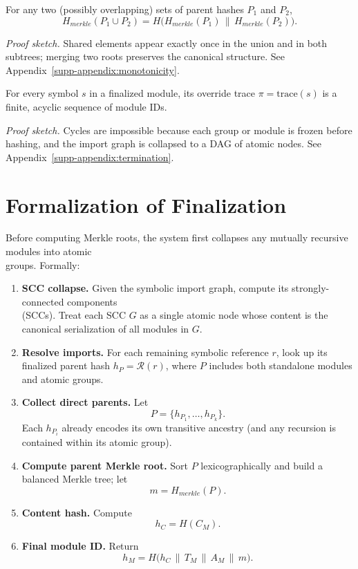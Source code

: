 \documentclass[sigplan,screen]{acmart}
\begin{document}
\begin{theorem}
\label{thm:merkleHash_compositional}
For any two (possibly overlapping) sets of parent hashes \(P_1\) and \(P_2\),
\[
	H_{\mathit{merkle}}(P_1 \cup P_2)
		= H\bigl(H_{\mathit{merkle}}(P_1)\,\|\,
			H_{\mathit{merkle}}(P_2)\bigr).
\]
\end{theorem}
\noindent\emph{Proof sketch.}  Shared elements appear exactly once in the union and in both subtrees; merging two roots preserves the canonical structure.  See Appendix~\ref{supp-appendix:monotonicity}.

\begin{proposition}
\label{prop:overrideTrace_properties}
For every symbol \(s\) in a finalized module, its override trace \(\pi = \mathrm{trace}(s)\) is a finite, acyclic sequence of module IDs.
\end{proposition}
\noindent\emph{Proof sketch.}  Cycles are impossible because each group or module is frozen before hashing, and the import graph is collapsed to a DAG of atomic nodes.  See Appendix~\ref{supp-appendix:termination}.

\section{Formalization of Finalization}
\label{sec:formalization-finalization}

Before computing Merkle roots, the system first collapses any mutually recursive modules into atomic \\groups. Formally:

\begin{enumerate}
	\item \textbf{SCC collapse.} Given the symbolic import graph, compute its strongly-connected components \\(SCCs). Treat each SCC \(G\) as a single atomic node whose content is the canonical serialization of all modules in \(G\).
	\item \textbf{Resolve imports.} For each remaining symbolic reference \(r\), look up its finalized parent hash \(h_{P} = \mathcal{R}(r)\), where \(P\) includes both standalone modules and atomic groups.
	\item \textbf{Collect direct parents.} Let
	\[
		P = \{h_{P_1}, \dots, h_{P_k}\}.
	\]
	Each \(h_{P_i}\) already encodes its own transitive ancestry (and any recursion is contained within its atomic group).
	\item \textbf{Compute parent Merkle root.} Sort \(P\) lexicographically and build a balanced Merkle tree; let
	\[
		m = H_{\mathit{merkle}}(P).
	\]
	\item \textbf{Content hash.} Compute
	\[
		h_C = H(C_M).
	\]
	\item \textbf{Final module ID.} Return
	\[
		h_M = H\bigl(h_C \,\|\, T_M \,\|\, A_M \,\|\, m\bigr).
	\]
\end{enumerate}
\end{document}
